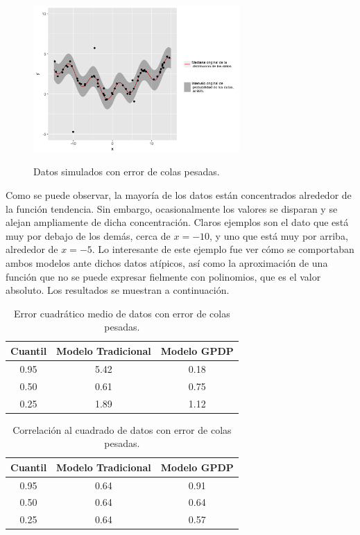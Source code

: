 \begin{figure}[H]
	\centering
	\caption{Datos simulados con error de colas pesadas.}
	\includegraphics[width=0.7\textwidth]{Figures/Simulation/heavy_tails/sample.png}
	\label{sample_heavy_tails}
\end{figure}

Como se puede observar, la mayor\'ia de los datos est\'an concentrados alrededor de la funci\'on tendencia. Sin embargo, ocasionalmente los valores se disparan y se alejan ampliamente de dicha concentraci\'on. Claros ejemplos son el dato que est\'a muy por debajo de los dem\'as, cerca de $x = -10$, y uno que est\'a muy por arriba, alrededor de $x = -5$. Lo interesante de este ejemplo fue ver c\'omo se comportaban ambos modelos ante dichos datos at\'ipicos, as\'i como la aproximaci\'on de una funci\'on que no se puede expresar fielmente con polinomios, que es el valor absoluto. Los resultados se muestran a continuaci\'on.

\begin{table}[H]
\centering
\caption{Error cuadrático medio de datos con error de colas pesadas.} 
\begin{tabular}{ccc}
  \hline
Cuantil & Modelo Tradicional & Modelo GPDP \\ 
  \hline
0.95 & 5.42 & 0.18 \\ 
  0.50 & 0.61 & 0.75 \\ 
  0.25 & 1.89 & 1.12 \\ 
   \hline
\end{tabular}
\label{mse_heavy_tails}
\end{table}

\begin{table}[H]
\centering
\caption{Correlación al cuadrado de datos con error de colas pesadas.} 
\begin{tabular}{ccc}
  \hline
Cuantil & Modelo Tradicional & Modelo GPDP \\ 
  \hline
0.95 & 0.64 & 0.91 \\ 
  0.50 & 0.64 & 0.64 \\ 
  0.25 & 0.64 & 0.57 \\ 
   \hline
\end{tabular}
\label{corr_heavy_tails}
\end{table}

